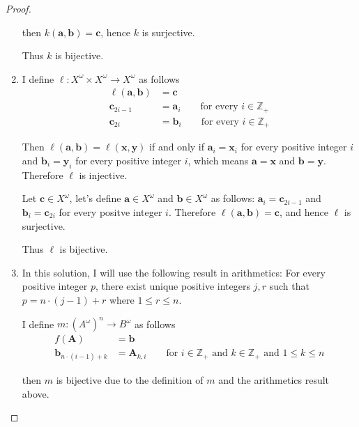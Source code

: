 \begin{proof}
\begin{enumerate}[label={(\alph*)}]
              then $k(\mathbf{a}, \mathbf{b}) = \mathbf{c}$, hence $k$ is surjective.

              Thus $k$ is bijective.
        \item I define $\ell: X^{\omega}\times X^{\omega}\to X^{\omega}$ as follows
              \begin{align*}
                  \ell(\mathbf{a}, \mathbf{b}) & = \mathbf{c}                                                 \\
                  \mathbf{c}_{2i-1}            & = \mathbf{a}_{i}\qquad \text{for every $i\in\mathbb{Z}_{+}$} \\
                  \mathbf{c}_{2i}              & = \mathbf{b}_{i}\qquad \text{for every $i\in\mathbb{Z}_{+}$}
              \end{align*}

              Then $\ell(\mathbf{a}, \mathbf{b}) = \ell(\mathbf{x}, \mathbf{y})$ if and only if $\mathbf{a}_{i} = \mathbf{x}_{i}$ for every positive integer $i$ and $\mathbf{b}_{i} = \mathbf{y}_{i}$ for every positive integer $i$, which means $\mathbf{a} = \mathbf{x}$ and $\mathbf{b} = \mathbf{y}$. Therefore $\ell$ is injective.

              Let $\mathbf{c}\in X^{\omega}$, let's define $\mathbf{a}\in X^{\omega}$ and $\mathbf{b}\in X^{\omega}$ as follows: $\mathbf{a}_{i} = \mathbf{c}_{2i-1}$ and $\mathbf{b}_{i} = \mathbf{c}_{2i}$ for every positve integer $i$. Therefore $\ell(\mathbf{a}, \mathbf{b}) = \mathbf{c}$, and hence $\ell$ is surjective.

              Thus $\ell$ is bijective.
        \item In this solution, I will use the following result in arithmetics: For every positive integer $p$, there exist unique positive integers $j, r$ such that $p = n\cdot (j - 1) + r$ where $1\leq r\leq n$.

              I define $m: {(A^{\omega})}^{n}\to B^{\omega}$ as follows
              \begin{align*}
                  f(\mathbf{A})                 & = \mathbf{b}                                                                                          \\
                  \mathbf{b}_{n\cdot (i-1) + k} & = \mathbf{A}_{k, i}\qquad\text{for $i\in\mathbb{Z}_{+}$ and $k\in\mathbb{Z}_{+}$ and $1\leq k\leq n$}
              \end{align*}

              then $m$ is bijective due to the definition of $m$ and the arithmetics result above.
    \end{enumerate}
\end{proof}

